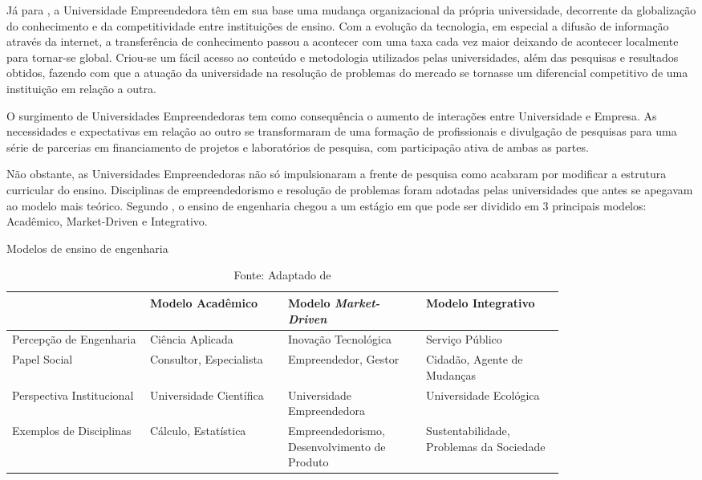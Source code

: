 Já para , a Universidade Empreendedora têm em sua base uma mudança organizacional da própria universidade, decorrente da globalização do conhecimento e da competitividade entre instituições de ensino. Com a evolução da tecnologia, em especial a difusão de informação através da internet, a transferência de conhecimento passou a acontecer com uma taxa cada vez maior deixando de acontecer localmente para tornar-se global. Criou-se um fácil acesso ao conteúdo e metodologia utilizados pelas universidades, além das pesquisas e resultados obtidos, fazendo com que a atuação da universidade na resolução de problemas do mercado se tornasse um diferencial competitivo de uma instituição em relação a outra.

O surgimento de Universidades Empreendedoras tem como consequência o aumento de interações entre Universidade e Empresa. As necessidades e expectativas em relação ao outro se transformaram de uma formação de profissionais e divulgação de pesquisas para uma série de parcerias em financiamento de projetos e laboratórios de pesquisa, com participação ativa de ambas as partes.

Não obstante, as Universidades Empreendedoras não só impulsionaram a frente de pesquisa como acabaram por modificar a estrutura curricular do ensino. Disciplinas de empreendedorismo e resolução de problemas foram adotadas pelas universidades que antes se apegavam ao modelo mais teórico. Segundo , o ensino de engenharia chegou a um estágio em que pode ser dividido em 3 principais modelos: Acadêmico, Market-Driven e Integrativo.

\begin{table}[H]
\begin{center}
\caption{Modelos de ensino de engenharia}
\label{tab:modelos_ensino_tab}
{\def\arraystretch{2}\tabcolsep=10pt
\begin{tabular}{>{\raggedright}p{0.2\linewidth}>{\raggedright\arraybackslash}p{0.2\linewidth}>{\raggedright\arraybackslash}p{0.2\linewidth}>{\raggedright\arraybackslash}p{0.2\linewidth}}
\hline
     & Modelo Acadêmico & Modelo \textit{Market-Driven} & Modelo Integrativo \\ \hline
     Percepção de Engenharia & Ciência Aplicada & Inovação Tecnológica & Serviço Público \\
     Papel Social & Consultor, Especialista & Empreendedor, Gestor & Cidadão, Agente de Mudanças \\
     Perspectiva Institucional & Universidade Científica & Universidade Empreendedora & Universidade Ecológica  \\
	 Exemplos de Disciplinas & Cálculo, Estatística & Empreendedorismo, Desenvolvimento de Produto & Sustentabilidade, Problemas da Sociedade \\ \hline
\end{tabular}%
}
\caption* {Fonte: Adaptado de }
\end{center}
\end{table}

